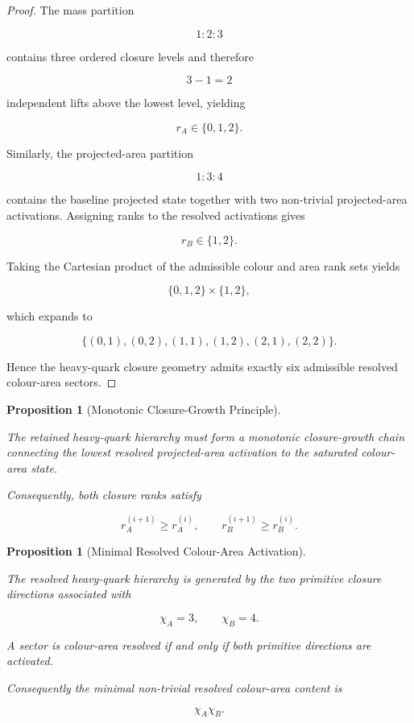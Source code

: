 \documentclass[11pt]{article}
\newtheorem{proposition}[theorem]{Proposition}
\theoremstyle{definition}
\theoremstyle{remark}
\begin{document}
\begin{proof}

The mass partition

\[
1:2:3
\]

contains three ordered closure levels and therefore

\[
3-1=2
\]

independent lifts above the lowest level, yielding

\[
r_A\in\{0,1,2\}.
\]

Similarly, the projected-area partition

\[
1:3:4
\]

contains the baseline projected state together with two
non-trivial projected-area activations. Assigning ranks to the
resolved activations gives

\[
r_B\in\{1,2\}.
\]

Taking the Cartesian product of the admissible colour and area
rank sets yields

\[
\{0,1,2\}
\times
\{1,2\},
\]

which expands to

\[
\{
(0,1),
(0,2),
(1,1),
(1,2),
(2,1),
(2,2)
\}.
\]

Hence the heavy-quark closure geometry admits exactly six
admissible resolved colour-area sectors.

\end{proof}

\begin{proposition}[Monotonic Closure-Growth Principle]
\label{prop:monotonic_closure_growth}

The retained heavy-quark hierarchy must form a monotonic
closure-growth chain connecting the lowest resolved
projected-area activation to the saturated colour-area state.

Consequently, both closure ranks satisfy

\begin{equation}
r_A^{(i+1)}
\ge
r_A^{(i)},
\qquad
r_B^{(i+1)}
\ge
r_B^{(i)}.
\end{equation}

\end{proposition}

\begin{proposition}[Minimal Resolved Colour-Area Activation]
\label{prop:minimal_resolved_colour_area_activation}

The resolved heavy-quark hierarchy is generated by the two
primitive closure directions associated with

\begin{equation}
\chi_A=3,
\qquad
\chi_B=4.
\end{equation}

A sector is colour-area resolved if and only if both primitive
directions are activated.

Consequently the minimal non-trivial resolved colour-area
content is

\begin{equation}
\chi_A\chi_B.
\end{equation}

\end{proposition}
\end{document}
